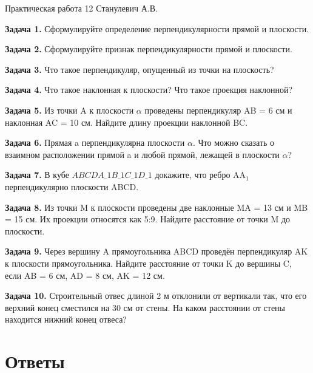 \documentclass{umk-matematika}
\begin{document}
\maketitlepage
    {Практическая работа 12}
    {}
    {Станулевич А.В.}

\textbf{Задача 1.} Сформулируйте определение перпендикулярности прямой и плоскости.\par\vspace{10pt}
\textbf{Задача 2.} Сформулируйте признак перпендикулярности прямой и плоскости.\par\vspace{10pt}
\textbf{Задача 3.} Что такое перпендикуляр, опущенный из точки на плоскость?\par\vspace{10pt}
\textbf{Задача 4.} Что такое наклонная к плоскости? Что такое проекция наклонной?\par\vspace{10pt}
\textbf{Задача 5.} Из точки A к плоскости $\alpha$ проведены перпендикуляр AB = 6 см и наклонная AC = 10 см. Найдите длину проекции наклонной BC.\par\vspace{10pt}
\textbf{Задача 6.} Прямая a перпендикулярна плоскости $\alpha$. Что можно сказать о взаимном расположении прямой a и любой прямой, лежащей в плоскости $\alpha$?\par\vspace{10pt}
\textbf{Задача 7.} В кубе $ABCDA\_1B\_1C\_1D\_1$ докажите, что ребро AA$_1$ перпендикулярно плоскости ABCD.\par\vspace{10pt}
\textbf{Задача 8.} Из точки M к плоскости проведены две наклонные MA = 13 см и MB = 15 см. Их проекции относятся как 5:9. Найдите расстояние от точки M до плоскости.\par\vspace{10pt}
\textbf{Задача 9.} Через вершину A прямоугольника ABCD проведён перпендикуляр AK к плоскости прямоугольника. Найдите расстояние от точки K до вершины C, если AB = 6 см, AD = 8 см, AK = 12 см.\par\vspace{10pt}
\textbf{Задача 10.} Строительный отвес длиной 2 м отклонили от вертикали так, что его верхний конец сместился на 30 см от стены. На каком расстоянии от стены находится нижний конец отвеса?\par\vspace{10pt}
\newpage
\section*{Ответы}
\end{document}
